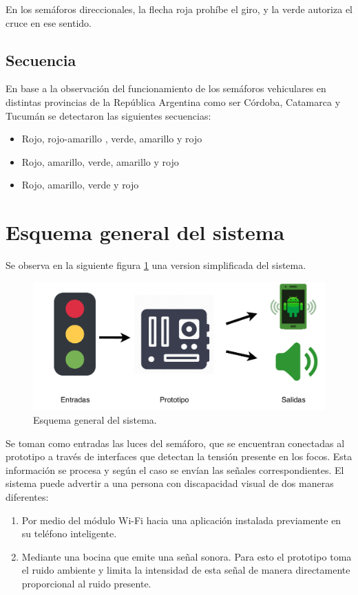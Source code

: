 En los semáforos direccionales, la flecha roja prohíbe el giro, y la verde autoriza el cruce en ese sentido.

\subsection{Secuencia}
En base a la observación del funcionamiento de los semáforos vehiculares en distintas provincias de la República Argentina como ser Córdoba, Catamarca y Tucumán se detectaron las siguientes secuencias:

\begin{itemize}
\item Rojo, rojo-amarillo , verde, amarillo y rojo
\item Rojo, amarillo, verde, amarillo y rojo
\item Rojo, amarillo, verde y rojo
\end{itemize}

\section{Esquema general del sistema}
Se observa en la siguiente figura \ref{fig:diagramaGeneral} una  version simplificada del sistema.

\begin{figure}[h]
	\centering
	\includegraphics[scale=.6]{./Figures/diagramaGeneral.pdf}
	\caption{Esquema general del sistema.}
	\label{fig:diagramaGeneral}
\end{figure}

Se toman como entradas las luces del semáforo, que se encuentran conectadas al prototipo a través de interfaces que detectan la tensión presente en los focos. Esta información se procesa y según el caso se envían las señales correspondientes. El sistema puede advertir a una persona con discapacidad visual de dos maneras diferentes:

\begin{enumerate}
\item Por medio del módulo Wi-Fi hacia una aplicación instalada previamente en su teléfono inteligente.
\item Mediante una bocina que emite una señal sonora. Para esto el prototipo toma el ruido ambiente y limita la intensidad de esta señal de manera directamente proporcional al ruido presente.
\end{enumerate}

